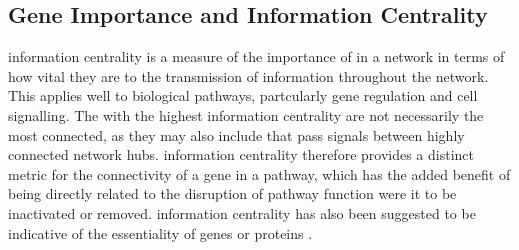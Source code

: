 \subsection{Gene Importance and Information Centrality}  \label{chapt4:Network_InfoCent}

\Gls{information centrality} is a measure of the importance of  in a network in terms of how vital they are to the transmission of information throughout the network. This applies well to biological \glspl{pathway}, partcularly gene regulation and cell signalling. The  with the highest \gls{information centrality} are not necessarily the most connected, as they may also include  that pass signals between highly connected network hubs. \Gls{information centrality} therefore provides a distinct metric for the connectivity of a gene in a \gls{pathway}, which has the added benefit of being directly related to the disruption of \gls{pathway} function were it to be inactivated or removed.
%
\Gls{information centrality} has also been suggested to be indicative of the essentiality of genes or proteins \citep{Kranthi2013}.%


